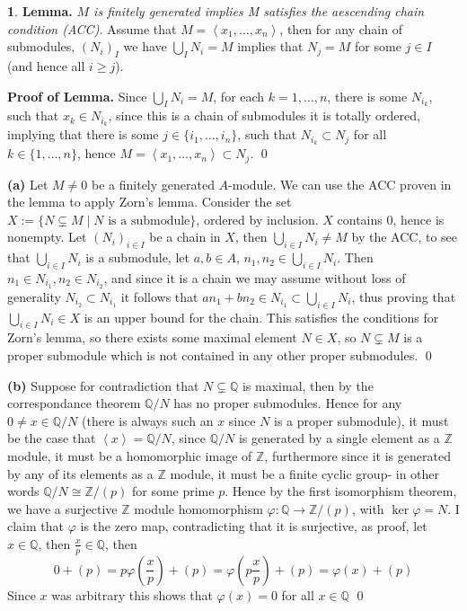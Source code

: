 \documentclass[11pt]{article}
\theoremstyle{definition}
\newtheorem{pb}{}
\newcommand{\set}[1]{\{#1\}}
\newcommand{\gen}[1]{\left\langle #1 \right\rangle}
\begin{document}
    \begin{pb}
        \textbf{Lemma.} \emph{\(M\) is finitely generated implies M satisfies the aescending chain condition (ACC)}. Assume that \(M = \gen{x_1,\hdots,x_n}\), then for any chain of submodules, \((N_i)_I\) we have \(\bigcup_I N_i = M\) implies that \(N_j = M\) for some \(j \in I\) (and hence all \(i \geq j\)).

        \textbf{Proof of Lemma.} Since \(\bigcup_I N_i = M\), for each \(k = 1,\hdots,n\), there is some \(N_{i_k}\), such that \(x_k \in N_{i_k}\), since this is a chain of submodules it is totally ordered, implying that there is some \(j \in \set{i_1,\hdots,i_n}\), such that \(N_{i_k} \subset N_j\) for all \(k \in \set{1,\hdots,n}\), hence \(M = \gen{x_1,\hdots,x_n} \subset N_j\). \qed

        \textbf{(a)}  Let \(M \neq 0\) be a finitely generated \(A\)-module. We can use the ACC proven in the lemma to apply Zorn's lemma. Consider the set \(X := \set{N \subsetneq M \mid N \text{ is a submodule}}\), ordered by inclusion. \(X\) contains \(0\), hence is nonempty. Let \((N_i)_{i\in I}\) be a chain in \(X\), then \(\bigcup_{i \in I}N_i \neq M\) by the ACC, to see that \(\bigcup_{i \in I}N_i\) is a submodule, let \(a,b \in A\), \(n_1, n_2 \in \bigcup_{i \in I}N_i\). Then \(n_1 \in N_{i_1}, n_2 \in N_{i_2}\), and since it is a chain we may assume without loss of generality \(N_{i_2} \subset N_{i_1}\) it follows that \(an_1 + bn_2 \in N_{i_1} \subset \bigcup_{i \in I}N_{i}\), thus proving that \(\bigcup_{i\in I}N_i \in X\) is an upper bound for the chain. This satisfies the conditions for Zorn's lemma, so there exists some maximal element \(N \in X\), so \(N \subsetneq M\) is a proper submodule which is not contained in any other proper submodules. \qed

        \textbf{(b)} Suppose for contradiction that \(N \subsetneq \mathbb{Q}\) is maximal, then by the correspondance theorem \(\mathbb{Q}/N\) has no proper submodules. Hence for any \(0 \neq x \in \mathbb{Q}/N\) (there is always such an \(x\) since \(N\) is a proper submodule), it must be the case that \(\gen{x} = \mathbb{Q}/N\), since \(\mathbb{Q}/N\) is generated by a single element as a \(\mathbb{Z}\) module, it must be a homomorphic image of \(\mathbb{Z}\), furthermore since it is generated by any of its elements as a \(\mathbb{Z}\) module, it must be a finite cyclic group- in other words \(\mathbb{Q}/N \cong \mathbb{Z}/(p)\) for some prime \(p\). Hence by the first isomorphism theorem, we have a surjective \(\mathbb{Z}\) module homomorphism \(\varphi: \mathbb{Q} \to \mathbb{Z}/(p)\), with \(\ker \varphi = N\). I claim that \(\varphi\) is the zero map, contradicting that it is surjective, as proof, let \(x \in \mathbb{Q}\), then \(\frac{x}{p} \in \mathbb{Q}\), then \[0 + (p) = p\varphi(\frac{x}{p}) + (p) = \varphi(p\frac{x}{p}) + (p) = \varphi(x) + (p)\]
        Since \(x\) was arbitrary this shows that \(\varphi(x) = 0\) for all \(x \in \mathbb{Q}\) \qed
    \end{pb}
\end{document}
